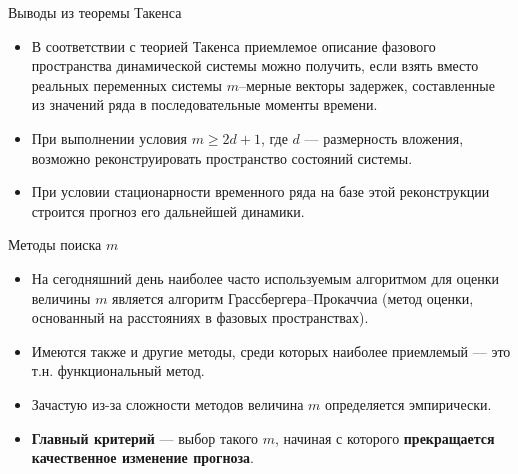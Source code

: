 \begin{frame}{Выводы из теоремы Такенса}
\begin{itemize}
    \item  В соответствии с теорией Такенса приемлемое описание фазового пространства динамической
системы можно получить, если взять вместо реальных переменных системы  $m$–мерные векторы задержек, составленные из значений ряда в последовательные моменты времени.
    \item При выполнении условия $m \geq 2d + 1$, где $d$ — размерность вложения, возможно реконструировать пространство состояний системы.
    \item При условии стационарности временного ряда на базе этой реконструкции строится прогноз его дальнейшей динамики.
\end{itemize}
\end{frame}

\begin{frame}{Методы поиска $m$}
\begin{itemize}
    \item На сегодняшний день наиболее часто используемым алгоритмом для оценки величины $m$ является алгоритм Грассбергера–Прокаччиа (метод оценки, основанный на расстояниях в фазовых пространствах).
    \item Имеются также и другие методы, среди которых наиболее приемлемый — это т.н. функциональный метод.
    \item Зачастую из-за сложности методов величина $m$ определяется эмпирически.
    \item \textbf{Главный критерий} --- выбор такого $m$, начиная с которого \textbf{прекращается качественное изменение прогноза}.
\end{itemize}

\end{frame}


